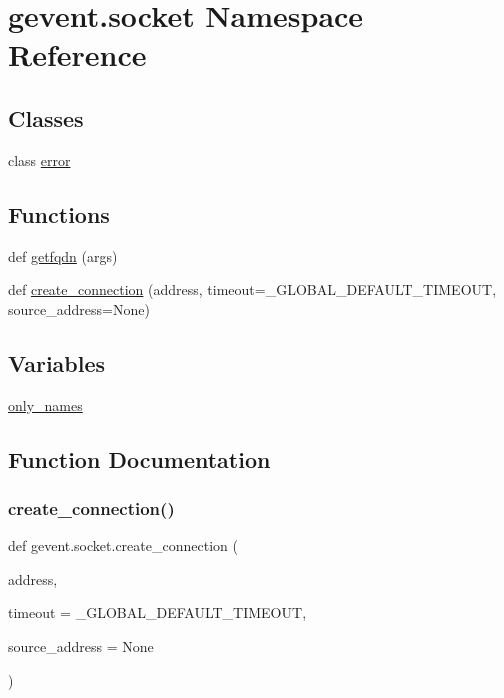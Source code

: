 \hypertarget{namespacegevent_1_1socket}{}\section{gevent.\+socket Namespace Reference}
\label{namespacegevent_1_1socket}
\subsection*{Classes}
\begin{DoxyCompactItemize}
\item 
class \hyperlink{classgevent_1_1socket_1_1error}{error}
\end{DoxyCompactItemize}
\subsection*{Functions}
\begin{DoxyCompactItemize}
\item 
def \hyperlink{namespacegevent_1_1socket_ae9e275f44ef03a2a34bf7d2e339b7fa5}{getfqdn} (args)
\item 
def \hyperlink{namespacegevent_1_1socket_a4779a15abebff9edb10cf68d1a4a0dcf}{create\+\_\+connection} (address, timeout=\+\_\+\+G\+L\+O\+B\+A\+L\+\_\+\+D\+E\+F\+A\+U\+L\+T\+\_\+\+T\+I\+M\+E\+O\+UT, source\+\_\+address=None)
\end{DoxyCompactItemize}
\subsection*{Variables}
\begin{DoxyCompactItemize}
\item 
\hyperlink{namespacegevent_1_1socket_adf1c14efa060acbfd56cde8ad6ff2f51}{only\+\_\+names}
\end{DoxyCompactItemize}


\subsection{Function Documentation}
\mbox{\label{namespacegevent_1_1socket_a4779a15abebff9edb10cf68d1a4a0dcf}} 
\subsubsection{\texorpdfstring{create\+\_\+connection()}{create\_connection()}}
{\footnotesize\ttfamily def gevent.\+socket.\+create\+\_\+connection (\begin{DoxyParamCaption}\item[{}]{address,  }\item[{}]{timeout = {\ttfamily \+\_\+GLOBAL\+\_\+DEFAULT\+\_\+TIMEOUT},  }\item[{}]{source\+\_\+address = {\ttfamily None} }\end{DoxyParamCaption})}

